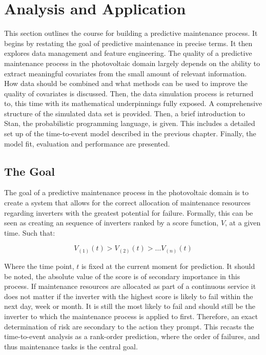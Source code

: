 \chapter*{Analysis and Application}


This section outlines the course for building a predictive maintenance process. It begins by restating the goal of predictive maintenance in precise terms. It then explores data management and feature engineering. The quality of a predictive maintenance process in the photovoltaic domain largely depends on the ability to extract meaningful covariates from the small amount of relevant information. How data should be combined and what methods can be used to improve the quality of covariates is discussed. Then, the data simulation process is returned to, this time with its mathematical underpinnings fully exposed. A comprehensive structure of the simulated data set is provided. Then, a brief introduction to Stan, the probabilistic programming language, is given. This includes a detailed set up of the time-to-event model described in the previous chapter. Finally, the model fit, evaluation and performance are presented.

\section*{The Goal}


The goal of a predictive maintenance process in the photovoltaic domain is to create a system that allows for the correct allocation of maintenance resources regarding inverters with the greatest potential for failure. Formally, this can be seen as creating an sequence of inverters ranked by a score function, $V$, at a given time. Such that:

$$ V_{(1)}(t) > V_{(2)}(t) > \dots V_{(n)}(t) $$

Where the time point, $t$ is fixed at the current moment for prediction. It should be noted, the absolute value of the score is of secondary importance in this process. If maintenance resources are allocated as part of a continuous service it does not matter if the inverter with the highest score is likely to fail within the next day, week or month. It is still the most likely to fail and should still be the inverter to which the maintenance process is applied to first. Therefore, an exact determination of risk are secondary to the action they prompt. This recasts the time-to-event analysis as a rank-order prediction, where the order of failures, and thus maintenance tasks is the central goal. 

